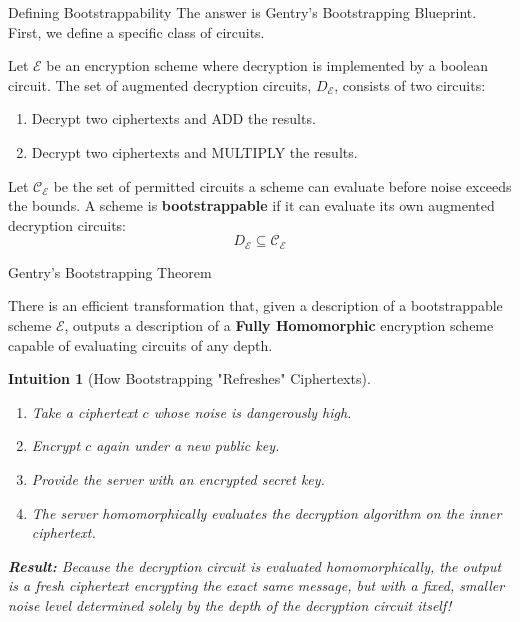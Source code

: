\documentclass[10pt, aspectratio=169]{beamer}
\newtheorem{intuition}{Intuition}
\begin{document}
\begin{frame}{Defining Bootstrappability}
    The answer is Gentry's Bootstrapping Blueprint. First, we define a specific class of circuits.
    \pause

    \vspace{0.3cm}
    \begin{definition}
    Let $\mathcal{E}$ be an encryption scheme where decryption is implemented by a boolean circuit. The set of augmented decryption circuits, $D_{\mathcal{E}}$, consists of two circuits: 
    \begin{enumerate}
        \item Decrypt two ciphertexts and ADD the results.
        \item Decrypt two ciphertexts and MULTIPLY the results.
    \end{enumerate}
    \end{definition}
    \pause

    \vspace{0.3cm}
    \begin{definition}
    Let $\mathcal{C}_{\mathcal{E}}$ be the set of permitted circuits a scheme can evaluate before noise exceeds the bounds. A scheme is \textbf{bootstrappable} if it can evaluate its own augmented decryption circuits:
    $$D_{\mathcal{E}} \subseteq \mathcal{C}_{\mathcal{E}}$$
    \end{definition}
\end{frame}

\begin{frame}{Gentry's Bootstrapping Theorem}
    \begin{theorem}
    There is an efficient transformation that, given a description of a bootstrappable scheme $\mathcal{E}$, outputs a description of a \textbf{Fully Homomorphic} encryption scheme capable of evaluating circuits of any depth.
    \end{theorem}
    \pause
    
    \vspace{0.3cm}
    \begin{intuition}[How Bootstrapping "Refreshes" Ciphertexts]
    \begin{enumerate}
        \item Take a ciphertext $c$ whose noise is dangerously high.
        \item Encrypt $c$ \textit{again} under a new public key.
        \item Provide the server with an \textit{encrypted} secret key.
        \item The server homomorphically evaluates the decryption algorithm on the inner ciphertext.
    \end{enumerate}
    \pause
    \textbf{Result:} Because the decryption circuit is evaluated homomorphically, the output is a fresh ciphertext encrypting the exact same message, but with a fixed, smaller noise level determined solely by the depth of the decryption circuit itself!
    \end{intuition}
\end{frame}
\end{document}
